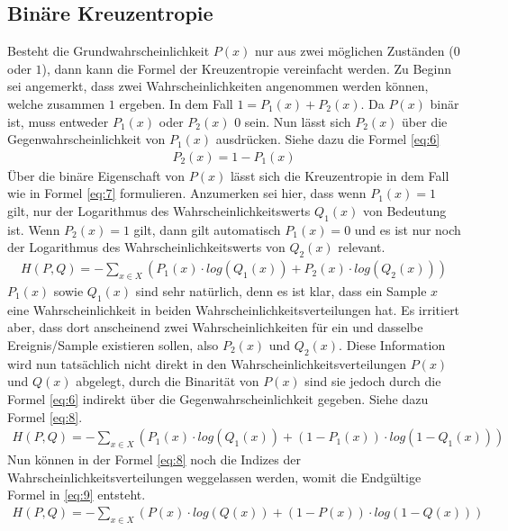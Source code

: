 \subsection{Binäre Kreuzentropie}\label{anhang:binary:kreuzentropie}
Besteht die Grundwahrscheinlichkeit $P(x)$ nur aus zwei möglichen Zuständen ($0$ oder $1$), dann kann die Formel der Kreuzentropie
vereinfacht werden. Zu Beginn sei angemerkt, dass zwei Wahrscheinlichkeiten angenommen werden können, welche zusammen
$1$ ergeben. In dem Fall $1 = P_1(x) + P_2(x)$. Da $P(x)$ binär ist, muss entweder $P_1(x)$ oder $P_2(x)$ $0$ sein.
Nun lässt sich $P_2(x)$ über die Gegenwahrscheinlichkeit von $P_1(x)$ ausdrücken. Siehe dazu die Formel \ref{eq:6}
\begin{align}
    P_2(x) = 1 - P_1(x)\label{eq:6}
\end{align}
Über die binäre Eigenschaft von $P(x)$ lässt sich die Kreuzentropie in dem Fall wie in Formel \ref{eq:7} formulieren.
Anzumerken sei hier, dass wenn $P_1(x) = 1$ gilt, nur der Logarithmus des Wahrscheinlichkeitswerts $Q_1(x)$ von Bedeutung ist.
Wenn $P_2(x) = 1$ gilt, dann gilt automatisch $P_1(x) = 0$ und es ist nur noch der Logarithmus des Wahrscheinlichkeitswerts von
$Q_2(x)$ relevant.
\begin{align}
    H(P,Q) = - \sum_{x \in X} (P_1(x) \cdot log(Q_1(x)) + P_2(x) \cdot log(Q_2(x)))\label{eq:7}
\end{align}
$P_1(x)$ sowie $Q_1(x)$ sind sehr natürlich, denn es ist klar, dass ein Sample $x$ eine Wahrscheinlichkeit
in beiden Wahrscheinlichkeitsverteilungen hat. Es irritiert aber, dass dort anscheinend zwei Wahrscheinlichkeiten für ein und
dasselbe Ereignis/Sample existieren sollen, also $P_2(x)$ und $Q_2(x)$. Diese Information wird nun tatsächlich nicht direkt in den
Wahrscheinlichkeitsverteilungen $P(x)$ und $Q(x)$ abgelegt, durch die Binarität von $P(x)$ sind sie jedoch durch die Formel
\ref{eq:6} indirekt über die Gegenwahrscheinlichkeit gegeben. Siehe dazu Formel \ref{eq:8}.
\begin{align}
    H(P,Q) = - \sum_{x \in X} (P_1(x) \cdot log(Q_1(x)) + (1 - P_1(x)) \cdot log(1 - Q_1(x)))\label{eq:8}
\end{align}
Nun können in der Formel \ref{eq:8} noch die Indizes der Wahrscheinlichkeitsverteilungen weggelassen werden, womit
die Endgültige Formel in \ref{eq:9} entsteht.
\begin{align}
    H(P,Q) = - \sum_{x \in X} (P(x) \cdot log(Q(x)) + (1 - P(x)) \cdot log(1 - Q(x)))\label{eq:9}
\end{align}

